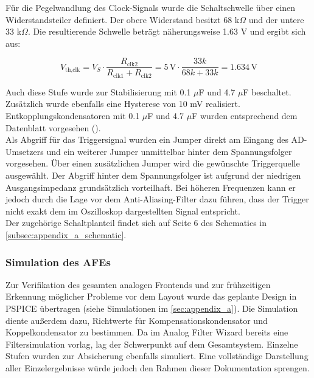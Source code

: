 \documentclass[a4paper, portrait, 12pt]{scrartcl} %
\begin{document}
Für die Pegelwandlung des Clock-Signals wurde die Schaltschwelle über einen Widerstandsteiler definiert. Der obere Widerstand besitzt 68 k$\Omega$ und der untere 33 k$\Omega$. Die resultierende Schwelle beträgt näherungsweise 1.63 V und ergibt sich aus:

\[
V_{\text{th,clk}} = V_S \cdot \frac{R_{\text{clk2}}}{R_{\text{clk1}} + R_{\text{clk2}}} = 5\,\text{V} \cdot \frac{33k}{68k + 33k} = 1.634\,\text{V}
\]

Auch diese Stufe wurde zur Stabilisierung mit 0.1 $\mu$F und 4.7 $\mu$F beschaltet. Zusätzlich wurde ebenfalls eine Hysterese von 10 mV realisiert. Entkopplungskondensatoren mit 0.1 $\mu$F und 4.7 $\mu$F wurden entsprechend dem Datenblatt vorgesehen (\cite[S. 9]{LinearTechnology1714}).\\

Als Abgriff für das Triggersignal wurden ein Jumper direkt am Eingang des AD-Umsetzers und ein weiterer Jumper unmittelbar hinter dem Spannungsfolger vorgesehen. Über einen zusätzlichen Jumper wird die gewünschte Triggerquelle ausgewählt. Der Abgriff hinter dem Spannungsfolger ist aufgrund der niedrigen Ausgangsimpedanz grundsätzlich vorteilhaft. Bei höheren Frequenzen kann er jedoch durch die Lage vor dem Anti-Aliasing-Filter dazu führen, dass der Trigger nicht exakt dem im Oszilloskop dargestellten Signal entspricht.\\

Der zugehörige Schaltplanteil findet sich auf Seite 6 des Schematics in \autoref{subsec:appendix_a_schematic}.


\subsubsection{Simulation des AFEs}

Zur Verifikation des gesamten analogen Frontends und zur frühzeitigen Erkennung möglicher Probleme vor dem Layout wurde das geplante Design in PSPICE übertragen (siehe Simulationen im \autoref{sec:appendix_a}). Die Simulation diente außerdem dazu, Richtwerte für Kompensationskondensator und Koppelkondensator zu bestimmen. Da im Analog Filter Wizard bereits eine Filtersimulation vorlag, lag der Schwerpunkt auf dem Gesamtsystem. Einzelne Stufen wurden zur Absicherung ebenfalls simuliert. Eine vollständige Darstellung aller Einzelergebnisse würde jedoch den Rahmen dieser Dokumentation sprengen.\\
\end{document}
